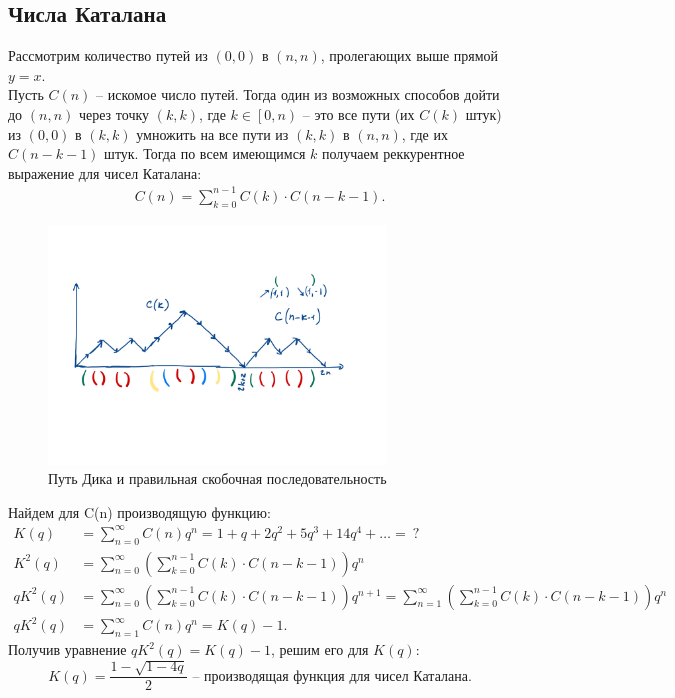 \documentclass[a4paper,14pt]{article}
\begin{document}
\subsection*{Числа Каталана}
Рассмотрим количество путей из $\left( 0, 0 \right) $ в $\left( n, n \right) $,
пролегающих выше прямой $y = x$. \\
Пусть $C(n)$ – искомое число путей. Тогда один из возможных способов дойти до
$\left(n, n\right) $ через точку $\left( k, k \right)$, где $k  \in \left[0, n\right)$ – это
все пути (их $C(k) $ штук) из $\left( 0, 0 \right) $ в $\left( k, k \right) $
умножить на все пути из $\left( k, k \right) $ в $\left( n, n \right) $, где их
$C(n - k - 1) $ штук. Тогда по всем имеющимся $k$ получаем реккурентное выражение для 
чисел Каталана:
\begin{align*}
	C(n) = \sum_{k=0}^{n - 1} C(k) \cdot  C(n - k - 1)
.\end{align*}
\begin{figure}[!htpb]
	\centering
	\includegraphics[width=0.8\textwidth]{images/dyck}
	\caption{Путь Дика и правильная скобочная последовательность}
	\label{fig:dyck}
\end{figure}
Найдем для C(n) производящую функцию:
\begin{align*}
	K(q) &= \sum_{n=0}^{\infty} C(n)q^n = 1 + q + 2q^2 + 5q^3 + 14q^4 + \ldots = \ ? \\
	K^2(q) &= \sum_{n=0}^{\infty}\left( \sum_{k=0}^{n - 1}C(k) \cdot C(n - k - 1) \right) q^n \\
	qK^2(q) & = \sum_{n=0}^{\infty}\left( \sum_{k=0}^{n - 1}C(k) \cdot C(n - k - 1) \right) q^{n + 1} =
	\sum_{n=1}^{\infty}\left( \sum_{k=0}^{n - 1}C(k) \cdot C(n - k - 1) \right) q^n \\
	qK^2(q) &= \sum_{n=1}^{\infty} C(n)q^n = K(q) - 1
.\end{align*}
Получив уравнение $qK^2(q) = K(q) - 1$, решим его для $K(q)$:
\[
	K(q) = \frac{1 - \sqrt{1 - 4q}}{2} \text{ – производящая функция для чисел Каталана.} 
\] 
\end{document}

